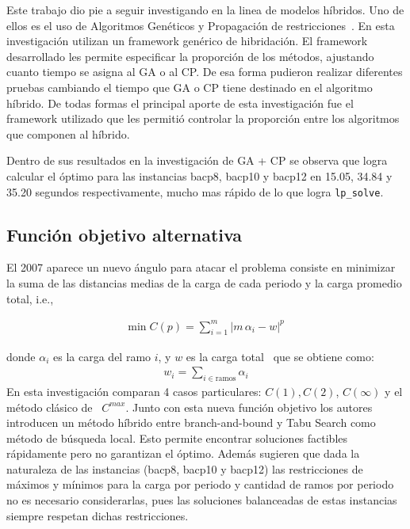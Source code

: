 \documentclass[letterpaper,10pt]{article}
\begin{document}
Este trabajo dio pie a seguir investigando en la linea de modelos híbridos. Uno de ellos es el uso de Algoritmos Genéticos y Propagación de restricciones~\cite{Rutkowski}. En esta investigación utilizan un framework genérico de hibridación. El framework desarrollado les permite especificar la proporción de los métodos, ajustando cuanto tiempo se asigna al GA o al CP. De esa forma pudieron realizar diferentes pruebas cambiando el tiempo que GA o CP tiene destinado en el algoritmo híbrido. De todas formas el principal aporte de esta investigación fue el framework utilizado que les permitió controlar la proporción entre los algoritmos que componen al híbrido.

Dentro de sus resultados en la investigación de GA + CP se observa que logra calcular el óptimo para las instancias bacp8, bacp10 y bacp12 en 15.05, 34.84 y 35.20 segundos respectivamente, mucho mas rápido de lo que logra \verb+lp_solve+.

\subsection{Función objetivo alternativa}

El 2007 aparece un nuevo ángulo para atacar el problema consiste en minimizar la suma de las distancias medias de la carga de cada periodo y la carga promedio total, i.e.,

\begin{align*}
  \text{min} \; C(p) = \sum_{i=1}^{m} |m\,\alpha_i - w |^p
\end{align*}

donde $\alpha_i$ es la carga del ramo $i$, y $w$ es la carga total~\cite{Monette07acp} que se obtiene como:
\begin{align*}
  w_i = \sum_{i \in \text{ramos}} \alpha_i
\end{align*}
 En esta investigación comparan 4 casos particulares: $C(1), C(2)$, $C(\infty)$ y el método clásico de~\cite{DBLP:journals/corr/cs-PL-0110007} $C^{max}$. Junto con esta nueva función objetivo los autores introducen un método híbrido entre branch-and-bound y Tabu Search como método de búsqueda local. Esto permite encontrar soluciones factibles rápidamente pero no garantizan el óptimo.
Además sugieren que dada la naturaleza de las instancias (bacp8, bacp10 y bacp12) las restricciones de máximos y mínimos para la carga por periodo y cantidad de ramos por periodo no es necesario considerarlas, pues las soluciones balanceadas de estas instancias siempre respetan dichas restricciones.
\end{document}
